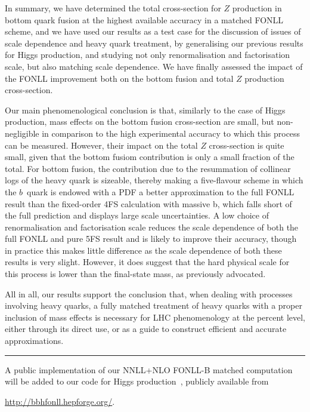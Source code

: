 \documentclass[12pt]{article}
\begin{document}
In summary, we have determined the total cross-section for $Z$
production in bottom quark fusion at the highest available accuracy in
a matched FONLL scheme,  and we have used our results as a test case for the
discussion of issues of scale dependence and heavy quark treatment, by
generalising our previous results for Higgs production, and studying
not only renormalisation and factorisation scale, but also matching
scale dependence. We have finally assessed the impact of the FONLL
improvement both on the bottom fusion and total $Z$ production
cross-section. 

Our main phenomenological conclusion is that,
similarly to the case of Higgs production,  mass effects on the bottom
fusion cross-section are small,
but non-negligible in comparison to the high experimental accuracy to
which this process can be measured. However, their impact on the total $Z$
cross-section is quite small, given that the bottom fusiom contribution
is only a small fraction of the total.
For bottom fusion, the contribution due to the
resummation of collinear logs of the heavy quark is sizeable, thereby
making a five-flavour scheme in which the $b$~quark is endowed with a PDF
a better approximation to the full FONLL result than the fixed-order
4FS calculation with massive b, which falls short of the full
prediction and displays large scale uncertainties. 
A low choice of
renormalisation and factorisation scale reduces the scale dependence
of both the full FONLL and pure 5FS result and is likely to improve
their accuracy, though in practice this makes little difference as the scale
dependence of both these results is very slight. However, it
does suggest that the hard physical scale for this process is
lower than the final-state mass, as previously advocated.


All in all, our results support the conclusion that, when dealing with
processes involving heavy quarks, a fully matched
treatment of heavy quarks with a proper inclusion of mass effects is
necessary for LHC phenomenology at the percent level, either through
its direct use, or as a guide to construct efficient and accurate
approximations. 

\bigskip
\bigskip
\begin{center}
  \rule{5cm}{.1pt}
\end{center}
\bigskip
\bigskip


A public implementation of our  NNLL+NLO FONLL-B matched computation
will be added to our code for Higgs
production~\cite{Forte:2016sja}, publicly available from 
\begin{center}
  \url{http://bbhfonll.hepforge.org/}.
\end{center}
\end{document}
